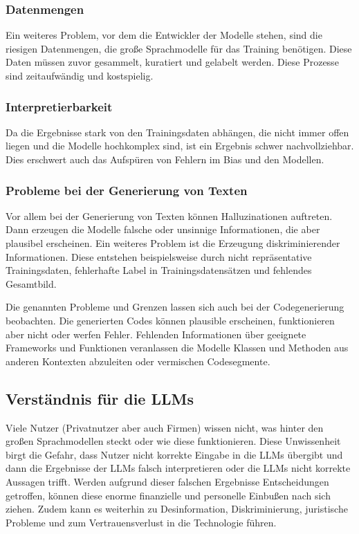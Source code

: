 \subsubsection{Datenmengen}
Ein weiteres Problem, vor dem die Entwickler der Modelle stehen, sind die riesigen Datenmengen, die große Sprachmodelle für das Training benötigen. Diese Daten müssen zuvor gesammelt, kuratiert und gelabelt werden. Diese Prozesse sind zeitaufwändig und kostspielig.

\subsubsection{Interpretierbarkeit}
Da die Ergebnisse stark von den Trainingsdaten abhängen, die nicht immer offen liegen und die Modelle hochkomplex sind, ist ein Ergebnis schwer nachvollziehbar. Dies erschwert auch das Aufspüren von Fehlern im Bias und den Modellen.

\subsubsection{Probleme bei der Generierung von Texten}
Vor allem bei der Generierung von Texten können Halluzinationen auftreten. Dann erzeugen die Modelle falsche oder unsinnige Informationen, die aber plausibel erscheinen. Ein weiteres Problem ist die Erzeugung diskriminierender Informationen. Diese entstehen beispielsweise durch nicht repräsentative Trainingsdaten, fehlerhafte Label in Trainingsdatensätzen und fehlendes Gesamtbild.\vspace{0.2cm}

Die genannten Probleme und Grenzen lassen sich auch bei der Codegenerierung beobachten. Die generierten Codes können plausible erscheinen, funktionieren aber nicht oder werfen Fehler. Fehlenden Informationen über geeignete Frameworks und Funktionen veranlassen die Modelle Klassen und Methoden aus anderen Kontexten abzuleiten oder vermischen Codesegmente.


\subsection{Verständnis für die LLMs}
Viele Nutzer (Privatnutzer aber auch Firmen) wissen nicht, was hinter den großen Sprachmodellen steckt oder wie diese funktionieren. Diese Unwissenheit birgt die Gefahr, dass Nutzer nicht korrekte Eingabe in die LLMs übergibt und dann die Ergebnisse der LLMs falsch interpretieren oder die LLMs nicht korrekte Aussagen trifft. Werden aufgrund dieser falschen Ergebnisse Entscheidungen getroffen, können diese enorme finanzielle und personelle Einbußen nach sich ziehen. Zudem kann es weiterhin zu Desinformation, Diskriminierung, juristische Probleme und zum Vertrauensverlust in die Technologie führen.\vspace{0.2cm}

